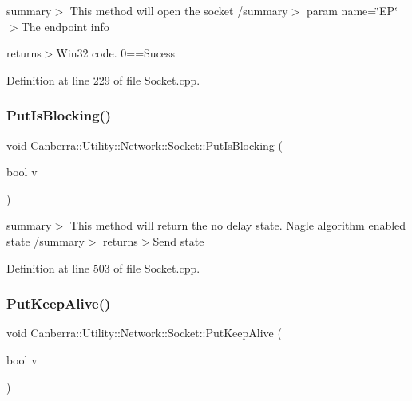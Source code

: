 summary$>$ This method will open the socket /summary$>$ param name=\char`\"{}\+E\+P\char`\"{}$>$The endpoint info

returns$>$Win32 code. 0==Sucess

Definition at line 229 of file Socket.\+cpp.

\mbox{\label{class_canberra_1_1_utility_1_1_network_1_1_socket_aa56e083937cdcc636c1e2c7ef41f3ec7_aa56e083937cdcc636c1e2c7ef41f3ec7}} 
\subsubsection{\texorpdfstring{Put\+Is\+Blocking()}{PutIsBlocking()}}
{\footnotesize\ttfamily void Canberra\+::\+Utility\+::\+Network\+::\+Socket\+::\+Put\+Is\+Blocking (\begin{DoxyParamCaption}\item[{bool}]{v }\end{DoxyParamCaption})}

summary$>$ This method will return the no delay state. Nagle algorithm enabled state /summary$>$ returns$>$Send state

Definition at line 503 of file Socket.\+cpp.

\mbox{\label{class_canberra_1_1_utility_1_1_network_1_1_socket_ae977dbecee4bf6e6b9b098d1573a8240_ae977dbecee4bf6e6b9b098d1573a8240}} 
\subsubsection{\texorpdfstring{Put\+Keep\+Alive()}{PutKeepAlive()}}
{\footnotesize\ttfamily void Canberra\+::\+Utility\+::\+Network\+::\+Socket\+::\+Put\+Keep\+Alive (\begin{DoxyParamCaption}\item[{bool}]{v }\end{DoxyParamCaption})}


